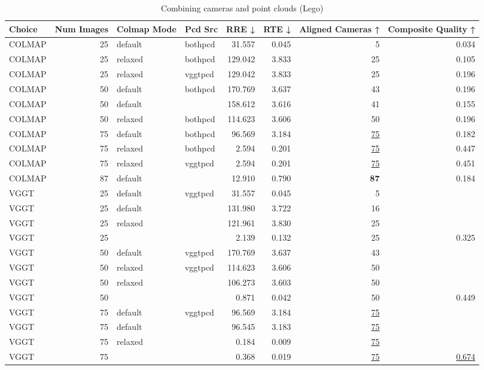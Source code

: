 \begin{table}[H]
\caption{Combining cameras and point clouds (Lego)}
\label{tab:07_combined_align_relaxed_lego}
\begin{tabular}{lrllrrrr}
\toprule
Choice & Num Images & Colmap Mode & Pcd Src & RRE ↓ & RTE ↓ & Aligned Cameras ↑ & Composite Quality ↑ \\
\midrule
COLMAP & 25 & default & bothpcd & 31.557 & 0.045 & 5 & 0.034 \\
COLMAP & 25 & relaxed & bothpcd & 129.042 & 3.833 & 25 & 0.105 \\
COLMAP & 25 & relaxed & vggtpcd & 129.042 & 3.833 & 25 & 0.196 \\
COLMAP & 50 & default & bothpcd & 170.769 & 3.637 & 43 & 0.196 \\
COLMAP & 50 & default &  & 158.612 & 3.616 & 41 & 0.155 \\
COLMAP & 50 & relaxed & bothpcd & 114.623 & 3.606 & 50 & 0.196 \\
COLMAP & 75 & default & bothpcd & 96.569 & 3.184 & \underline{75} & 0.182 \\
COLMAP & 75 & relaxed & bothpcd & 2.594 & 0.201 & \underline{75} & 0.447 \\
COLMAP & 75 & relaxed & vggtpcd & 2.594 & 0.201 & \underline{75} & 0.451 \\
COLMAP & 87 & default &  & 12.910 & 0.790 & \textbf{87} & 0.184 \\
VGGT & 25 & default & vggtpcd & 31.557 & 0.045 & 5 &  \\
VGGT & 25 & default &  & 131.980 & 3.722 & 16 &  \\
VGGT & 25 & relaxed &  & 121.961 & 3.830 & 25 &  \\
VGGT & 25 &  &  & 2.139 & 0.132 & 25 & 0.325 \\
VGGT & 50 & default & vggtpcd & 170.769 & 3.637 & 43 &  \\
VGGT & 50 & relaxed & vggtpcd & 114.623 & 3.606 & 50 &  \\
VGGT & 50 & relaxed &  & 106.273 & 3.603 & 50 &  \\
VGGT & 50 &  &  & 0.871 & 0.042 & 50 & 0.449 \\
VGGT & 75 & default & vggtpcd & 96.569 & 3.184 & \underline{75} &  \\
VGGT & 75 & default &  & 96.545 & 3.183 & \underline{75} &  \\
VGGT & 75 & relaxed &  & 0.184 & 0.009 & \underline{75} &  \\
VGGT & 75 &  &  & 0.368 & 0.019 & \underline{75} & \underline{0.674} \\

\end{tabular}
\end{table}
